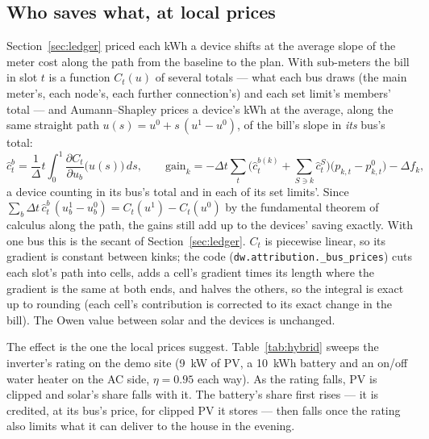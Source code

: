 \documentclass[11pt,a4paper]{article}
\newcommand{\dt}{\Delta t}
\begin{document}
\subsection{Who saves what, at local prices}

Section~\ref{sec:ledger} priced each kWh a device shifts at the average slope of
the meter cost along the path from the baseline to the plan. With sub-meters the
bill in slot $t$ is a function $C_t(u)$ of several totals --- what each bus draws
(the main meter's, each node's, each further connection's) and each set limit's
members' total --- and Aumann--Shapley prices a device's kWh at
the average, along the same straight path $u(s) = u^0 + s\,(u^1 - u^0)$, of the
bill's slope in \emph{its} bus's total:
\[
  \hat c^b_t = \frac1\dt\int_0^1 \frac{\partial C_t}{\partial u_b}\big(u(s)\big)\,ds,
  \qquad
  \text{gain}_k = -\dt\textstyle\sum_t \big(\hat c^{b(k)}_t + \sum_{S \ni k} \hat c^S_t\big)\big(p_{k,t} - p^0_{k,t}\big) - \Delta f_k ,
\]
a device counting in its bus's total and in each of its set limits'.
Since $\sum_b \dt\,\hat c^b_t\,(u^1_b - u^0_b) = C_t(u^1) - C_t(u^0)$ by the
fundamental theorem of calculus along the path, the gains still add up to the
devices' saving exactly. With one bus this is the secant of
Section~\ref{sec:ledger}. $C_t$ is piecewise linear, so its gradient is constant
between kinks; the code (\texttt{dw.attribution.\_bus\_prices}) cuts each slot's
path into cells, adds a cell's gradient times its length where the gradient is
the same at both ends, and halves the others, so the integral is exact up to
rounding (each cell's contribution is corrected to its exact change in the
bill). The Owen value between solar and the devices is unchanged.

The effect is the one the local prices suggest. Table~\ref{tab:hybrid} sweeps
the inverter's rating on the demo site (9~kW of PV, a 10~kWh battery and an
on/off water heater on the AC side, $\eta = 0.95$ each way). As the rating
falls, PV is clipped and solar's share falls with it. The battery's share first
rises --- it is credited, at its bus's price, for clipped PV it stores --- then
falls once the rating also limits what it can deliver to the house in the
evening.
\end{document}

